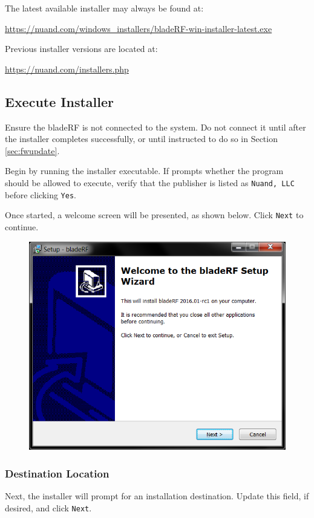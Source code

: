 The latest available installer may always be found at:

{\centerline{\footnotesize{\url{https://nuand.com/windows\_installers/bladeRF-win-installer-latest.exe}}}

Previous installer versions are located at:

\centerline{\footnotesize{\url{https://nuand.com/installers.php}}}

\subsection{Execute Installer}

Ensure the bladeRF is not connected to the system. Do not connect it until
after the installer completes successfully, or until instructed to do so in
Section \ref{sec:fwupdate}.

Begin by running the installer executable. If \windows prompts whether the
program should be allowed to execute, verify that the publisher is listed as
\texttt{Nuand, LLC} before clicking \texttt{Yes}.

Once started, a welcome screen will be presented, as shown below. Click \texttt{Next} to continue.

\begin{figure}[h]
  \centering
  \includegraphics{images/windows/installer/01-welcome.png}
\end{figure}

\newpage
\subsubsection{Destination Location} \label{sec:dest}
Next, the installer will prompt for an installation destination. Update this field, if desired, and click \texttt{Next}.

}
